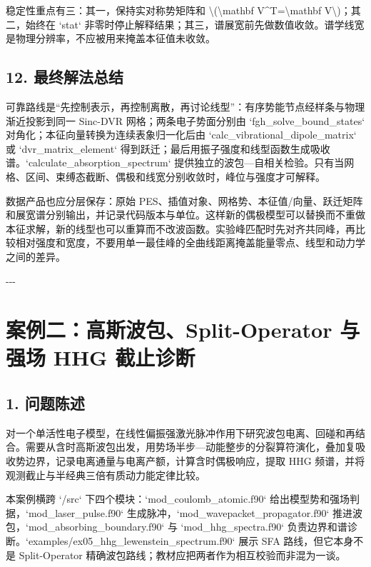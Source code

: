 \documentclass[UTF8,openany,11pt,fontset=fandol]{ctexbook}
\begin{document}
稳定性重点有三：其一，保持实对称势矩阵和
\textbackslash(\textbackslash mathbf V\^{}T=\textbackslash mathbf
V\textbackslash)；其二，始终在 `stat`
非零时停止解释结果；其三，谱展宽前先做数值收敛。谱学线宽是物理分辨率，不应被用来掩盖本征值未收敛。

\subsection{\texorpdfstring{\textbf{12.
最终解法总结}}{12. 最终解法总结}}\label{ux6700ux7ec8ux89e3ux6cd5ux603bux7ed3}

可靠路线是``先控制表示，再控制离散，再讨论线型''：有序势能节点经样条与物理渐近投影到同一
Sinc-DVR 网格；两条电子势面分别由 `fgh\_solve\_bound\_states`
对角化；本征向量转换为连续表象归一化后由
`calc\_vibrational\_dipole\_matrix` 或 `dvr\_matrix\_element`
得到跃迁；最后用振子强度和线型函数生成吸收谱。`calculate\_absorption\_spectrum`
提供独立的波包---自相关检验。只有当网格、区间、束缚态截断、偶极和线宽分别收敛时，峰位与强度才可解释。

数据产品也应分层保存：原始
PES、插值对象、网格势、本征值/向量、跃迁矩阵和展宽谱分别输出，并记录代码版本与单位。这样新的偶极模型可以替换而不重做本征求解，新的线型也可以重算而不改波函数。实验峰匹配时先对齐共同峰，再比较相对强度和宽度，不要用单一最佳峰的全曲线距离掩盖能量零点、线型和动力学之间的差异。

-\/-\/-

\section{\texorpdfstring{\textbf{案例二：高斯波包、Split-Operator
与强场 HHG
截止诊断}}{案例二：高斯波包、Split-Operator 与强场 HHG 截止诊断}}\label{ux6848ux4f8bux4e8cux9ad8ux65afux6ce2ux5305split-operator-ux4e0eux5f3aux573a-hhg-ux622aux6b62ux8bcaux65ad}

\subsection{\texorpdfstring{\textbf{1.
问题陈述}}{1. 问题陈述}}\label{ux95eeux9898ux9648ux8ff0-1}

对一个单活性电子模型，在线性偏振强激光脉冲作用下研究波包电离、回碰和再结合。需要从含时高斯波包出发，用势场半步---动能整步的分裂算符演化，叠加复吸收势边界，记录电离通量与电离产额，计算含时偶极响应，提取
HHG 频谱，并将观测截止与半经典三倍有质动力能定律比较。

本案例横跨 `/src` 下四个模块：`mod\_coulomb\_atomic.f90`
给出模型势和强场判据，`mod\_laser\_pulse.f90`
生成脉冲，`mod\_wavepacket\_propagator.f90`
推进波包，`mod\_absorbing\_boundary.f90` 与 `mod\_hhg\_spectra.f90`
负责边界和谱诊断。`examples/ex05\_hhg\_lewenstein\_spectrum.f90` 展示
SFA 路线，但它本身不是 Split-Operator
精确波包路线；教材应把两者作为相互校验而非混为一谈。
\end{document}
